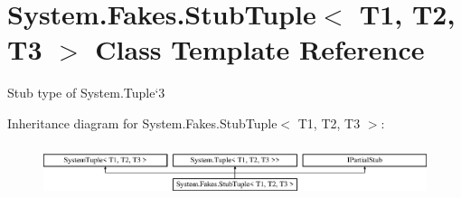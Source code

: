 \hypertarget{class_system_1_1_fakes_1_1_stub_tuple_3_01_t1_00_01_t2_00_01_t3_01_4}{\section{System.\-Fakes.\-Stub\-Tuple$<$ T1, T2, T3 $>$ Class Template Reference}
\label{class_system_1_1_fakes_1_1_stub_tuple_3_01_t1_00_01_t2_00_01_t3_01_4}
}


Stub type of System.\-Tuple`3 


Inheritance diagram for System.\-Fakes.\-Stub\-Tuple$<$ T1, T2, T3 $>$\-:\begin{figure}[H]
\begin{center}
\leavevmode
\includegraphics[height=1.542700cm]{class_system_1_1_fakes_1_1_stub_tuple_3_01_t1_00_01_t2_00_01_t3_01_4}
\end{center}
\end{figure}
